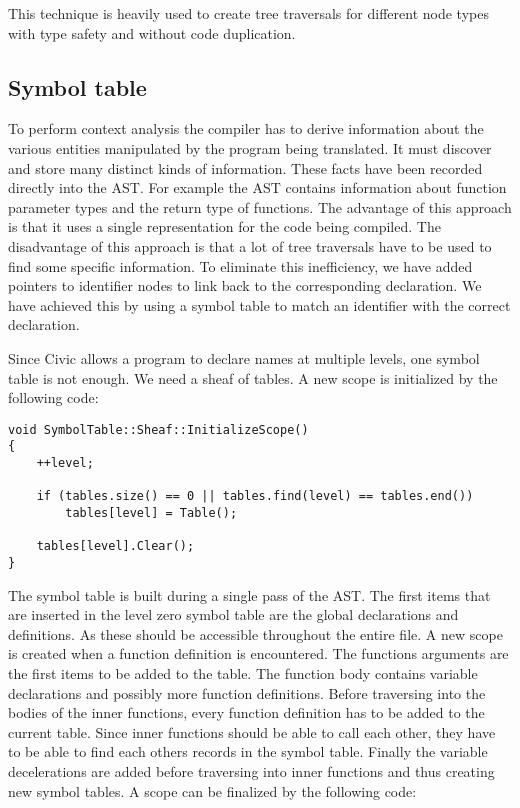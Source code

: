 \documentclass[12pt]{article}
\begin{document}
This technique is heavily used to create tree traversals for different node types with type safety and without code duplication.

\subsection{Symbol table}

To perform context analysis the compiler has to derive information about the various entities manipulated by the program being translated. It must discover and store many distinct kinds of information. These facts have been recorded directly into the AST. For example the AST contains information about function parameter types and the return type of functions. The advantage of this approach is that it uses a single representation for the code being compiled. The disadvantage of this approach is that a lot of tree traversals have to be used to find some specific information. To eliminate this inefficiency, we have added pointers to identifier nodes to link back to the corresponding declaration. We have achieved this by using a symbol table to match an identifier with the correct declaration.

Since Civic allows a program to declare names at multiple levels, one symbol table is not enough. We need a sheaf of tables. A new scope is initialized by the following code:

\begin{lstlisting}
void SymbolTable::Sheaf::InitializeScope()
{
	++level;

	if (tables.size() == 0 || tables.find(level) == tables.end())
		tables[level] = Table();
	
	tables[level].Clear();
}
\end{lstlisting}

The symbol table is built during a single pass of the AST. The first items that are inserted in the level zero symbol table are the global declarations and definitions. As these should be accessible throughout the entire file. A new scope is created when a function definition is encountered. The functions arguments are the first items to be added to the table. The function body contains variable declarations and possibly more function definitions. Before traversing into the bodies of the inner functions, every function definition has to be added to the current table. Since inner functions should be able to call each other, they have to be able to find each others records in the symbol table. Finally the variable decelerations are added before traversing into inner functions and thus creating new symbol tables. A scope can be finalized by the following code:
\end{document}
